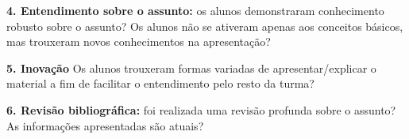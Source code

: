 \documentclass[a4paper,10pt]{article}
\begin{document}
    \textbf{4. Entendimento sobre o assunto:} os alunos demonstraram conhecimento robusto sobre o assunto? Os alunos não se ativeram apenas aos conceitos básicos, mas trouxeram  novos conhecimentos na apresentação?
    
    \textbf{5. Inovação} Os alunos trouxeram formas variadas de apresentar/explicar o material a fim de facilitar o entendimento pelo resto da turma?

    \textbf {6. Revisão bibliográfica:} foi realizada uma revisão profunda sobre o assunto? As informações apresentadas são atuais?


\vspace{10ex}

\end{document}
